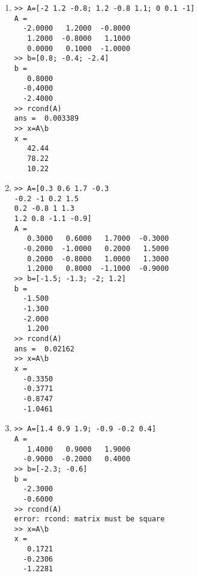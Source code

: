 \begin{exercise}
\begin{enumerate}
\item
\begin{verbatim}
>> A=[-2 1.2 -0.8; 1.2 -0.8 1.1; 0 0.1 -1]
A =
  -2.0000   1.2000  -0.8000
   1.2000  -0.8000   1.1000
   0.0000   0.1000  -1.0000
>> b=[0.8; -0.4; -2.4]
b =
   0.8000
  -0.4000
  -2.4000
>> rcond(A)
ans =  0.003389
>> x=A\b
x =
   42.44
   78.22
   10.22
\end{verbatim}



\item 
\begin{verbatim}
>> A=[0.3 0.6 1.7 -0.3
-0.2 -1 0.2 1.5
0.2 -0.8 1 1.3
1.2 0.8 -1.1 -0.9]
A =
   0.3000   0.6000   1.7000  -0.3000
  -0.2000  -1.0000   0.2000   1.5000
   0.2000  -0.8000   1.0000   1.3000
   1.2000   0.8000  -1.1000  -0.9000
>> b=[-1.5; -1.3; -2; 1.2]
b =
  -1.500
  -1.300
  -2.000
   1.200
>> rcond(A)
ans =  0.02162
>> x=A\b
x =
  -0.3350
  -0.3771
  -0.8747
  -1.0461
\end{verbatim}

\item {}
\begin{verbatim}
>> A=[1.4 0.9 1.9; -0.9 -0.2 0.4]
A =
   1.4000   0.9000   1.9000
  -0.9000  -0.2000   0.4000
>> b=[-2.3; -0.6]
b =
  -2.3000
  -0.6000
>> rcond(A)
error: rcond: matrix must be square
>> x=A\b
x =
   0.1721
  -0.2306
  -1.2281
\end{verbatim}


\end{enumerate}
\end{exercise}
